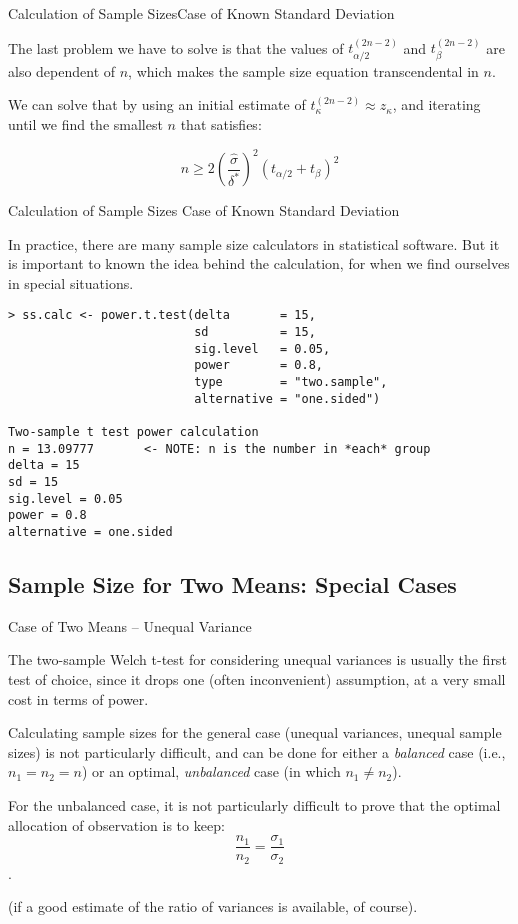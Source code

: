 \begin{frame}{Calculation of Sample Sizes}{Case of Known Standard Deviation}

The last problem we have to solve is that the values of $t^{(2n-2)}_{\alpha/2}$ and $t^{(2n-2)}_{\beta}$ are also dependent of $n$, which makes the sample size equation transcendental in $n$.\bigskip

We can solve that by using an initial estimate of $t^{(2n-2)}_{\kappa}\approx z_{\kappa}$, and iterating until we find the smallest $n$ that satisfies:

\begin{equation*}
  n \geq 2 \left(\frac{\hat{\sigma}}{\delta^*}\right)^2\left(t_{\alpha/2}+t_{\beta}\right)^2
\end{equation*}
\end{frame}


\begin{frame}[fragile]{Calculation of Sample Sizes}
{Case of Known Standard Deviation}

In practice, there are many sample size calculators in statistical software. But it is important to known the idea behind the calculation, for when we find ourselves in special situations.

{\smaller
\begin{verbatim}
> ss.calc <- power.t.test(delta       = 15,
                          sd          = 15,
                          sig.level   = 0.05,
                          power       = 0.8,
                          type        = "two.sample",
                          alternative = "one.sided")

Two-sample t test power calculation
n = 13.09777       <- NOTE: n is the number in *each* group
delta = 15
sd = 15
sig.level = 0.05
power = 0.8
alternative = one.sided
\end{verbatim}}
\end{frame}

\subsection{Sample Size for Two Means: Special Cases}


\begin{frame}{Case of Two Means -- Unequal Variance}

The two-sample Welch t-test for considering unequal variances is usually the first test of choice, since it drops one (often inconvenient) assumption, at a very small cost in terms of power.\bigskip

Calculating sample sizes for the general case (unequal variances, unequal sample sizes) is not particularly difficult, and can be done for either a \textit{balanced} case (i.e., $n_1 = n_2 = n$) or an optimal, \textit{unbalanced} case (in which $n_1 \neq n_2$).\bigskip

For the unbalanced case, it is not particularly difficult to prove that the optimal allocation of observation is to keep:
$$\frac{n_1}{n_2} = \frac{\sigma_1}{\sigma_2}$$.

(if a good estimate of the ratio of variances is available, of course).
\end{frame}

